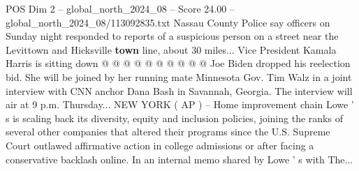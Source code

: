\begin{textsample}{POS Dim 2 – global\_north\_2024\_08 – Score 24.00 – global\_north\_2024\_08/113092835.txt}
Nassau County Police say officers on Sunday night responded to reports of a suspicious person on a street near the Levittown and Hicksville \textbf{town} line, about 30 miles...
Vice President Kamala Harris is sitting down @ @ @ @ @ @ @ @ @ @ Joe Biden dropped his reelection bid.
She will be joined by her running mate Minnesota Gov.
Tim Walz in a joint interview with CNN anchor Dana Bash in Savannah, Georgia.
The interview will air at 9 p.m.
Thursday...
NEW YORK ( AP ) -- Home improvement chain Lowe ' s is scaling back its diversity, equity and inclusion policies, joining the ranks of several other companies that altered their programs since the U.S.
Supreme Court outlawed affirmative action in college admissions or after facing a conservative backlash online.
In an internal memo shared by Lowe ' s with The...

\end{textsample}
